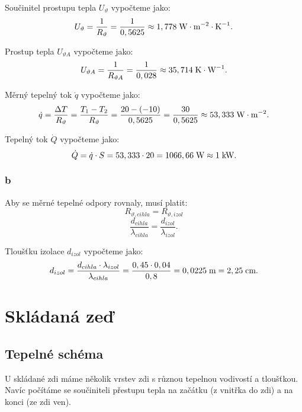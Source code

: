 \documentclass{article}
\begin{document}
Součinitel prostupu tepla $U_\vartheta$ vypočteme jako:
$$
    U_\vartheta = \frac{1}{R_{\vartheta}} = \frac{1}{0,5625} \approx 1,778 \; \textrm{W} \cdot \textrm{m}^{-2} \cdot \textrm{K}^{-1}.
$$

Prostup tepla $U_{\vartheta A}$ vypočteme jako:
$$
    U_{\vartheta A} = \frac{1}{R_{\vartheta A}} = \frac{1}{0,028} \approx 35,714 \; \textrm{K} \cdot \textrm{W}^{-1}.
$$

Měrný tepelný tok $\dot{q}$ vypočteme jako:
$$
    \dot{q} = \frac{\Delta T}{R_{\vartheta}} = \frac{T_1 - T_2}{R_{\vartheta}} = \frac{20 - (-10)}{0,5625} = \frac{30}{0,5625} \approx 53,333 \; \textrm{W} \cdot \textrm{m}^{-2}.
$$

Tepelný tok $\dot{Q}$ vypočteme jako:
$$
    \dot{Q} = \dot{q} \cdot S = 53,333 \cdot 20 = 1066,66 \; \textrm{W} \approx 1 \; \textrm{kW}.
$$


\subsubsection{b}
Aby se měrné tepelné odpory rovnaly, musí platit:
$$
    R_{\vartheta,cihla} = R_{\vartheta,izol}
$$
$$
    \frac{d_{cihla}}{\lambda_{cihla}} = \frac{d_{izol}}{\lambda_{izol}}.
$$

Tloušťku izolace $d_{izol}$ vypočteme jako:
$$
    d_{izol} = \frac{d_{cihla} \cdot \lambda_{izol}}{\lambda_{cihla}} = \frac{0,45 \cdot 0,04}{0,8} = 0,0225 \; \textrm{m} = 2,25 \; \textrm{cm}.
$$

\newpage




\section{ Skládaná zeď \spicy \spicy}



\subsection{Tepelné schéma}
U skládané zdi máme několik vrstev zdi s různou tepelnou vodivostí a tloušťkou. Navíc počítáme se součiniteli přestupu tepla na začátku (z vnitřka do zdi) a na konci (ze zdi ven).
\end{document}
